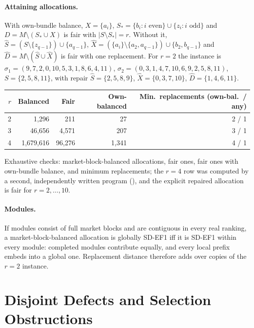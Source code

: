 \documentclass[11pt]{article}
\theoremstyle{definition}
\begin{document}
\paragraph{Attaining allocations.}
With own-bundle balance, $X=\{a_i\}$, $S_*=\{b_i:i\text{ even}\}\cup\{z_i:i\text{ odd}\}$ and $D=M\setminus(S_*\cup X)$ is fair with $|S\setminus S_*|=r$. Without it, $\widehat S=(S\setminus\{z_{q-1}\})\cup\{a_{q-1}\}$, $\widehat X=(\{a_i\}\setminus\{a_2,a_{q-1}\})\cup\{b_2,b_{q-1}\}$ and $\widehat D=M\setminus(\widehat S\cup\widehat X)$ is fair with one replacement. For $r=2$ the instance is $\sigma_1=(9,7,2,0,10,5,3,1,8,6,4,11)$, $\sigma_2=(0,3,1,4,7,10,6,9,2,5,8,11)$, $S=\{2,5,8,11\}$, with repair $\widehat S=\{2,5,8,9\}$, $\widehat X=\{0,3,7,10\}$, $\widehat D=\{1,4,6,11\}$.
\begin{center}\small
\begin{tabular}{@{}rrrrr@{}}
\toprule
$r$ & Balanced & Fair & Own-balanced & Min.\ replacements (own-bal.\ / any)\\ \midrule
2 & 1{,}296 & 211 & 27 & 2 / 1\\
3 & 46{,}656 & 4{,}571 & 207 & 3 / 1\\
4 & 1{,}679{,}616 & 96{,}276 & 1{,}341 & 4 / 1\\
\bottomrule
\end{tabular}
\end{center}
Exhaustive checks: market-block-balanced allocations, fair ones, fair ones with own-bundle balance, and minimum replacements; the $r=4$ row was computed by a second, independently written program (), and the explicit repaired allocation is fair for $r=2,\dots,10$.

\paragraph{Modules.}
If modules consist of full market blocks and are contiguous in every real ranking, a market-block-balanced allocation is globally SD-EF1 iff it is SD-EF1 within every module: completed modules contribute equally, and every local prefix embeds into a global one. Replacement distance therefore adds over copies of the $r=2$ instance.

\section{Disjoint Defects and Selection Obstructions}\label{app:defect}
\end{document}
